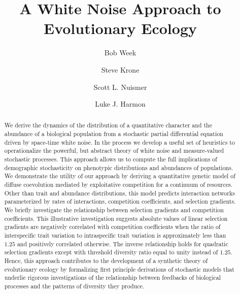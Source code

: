\documentclass[]{elsarticle} %
\begin{document}
\begin{frontmatter}

  \title{A White Noise Approach to Evolutionary Ecology}
    \author[Bio]{Bob Week}
    \author[Stats]{Steve Krone}
  
    \author[Bio]{Scott L. Nuismer}
  
    \author[Bio]{Luke J. Harmon}
  
      \address[Bio]{University of Idaho, Department of Biological Sciences, 875 Perimeter
Drive MS 3051, Moscow, Idaho, 83844}
    \address[Stats]{University of Idaho, Department of Statistical Science, 875 Perimeter
Drive MS 1104, Moscow, Idaho, 83844}
  
  \begin{abstract}
  We derive the dynamics of the distribution of a quantitative character
  and the abundance of a biological population from a stochastic partial
  differential equation driven by space-time white noise. In the process
  we develop a useful set of heuristics to operationalize the powerful,
  but abstract theory of white noise and measure-valued stochastic
  processes. This approach allows us to compute the full implications of
  demographic stochasticity on phenotypic distributions and abundances of
  populations. We demonstrate the utility of our approach by deriving a
  quantitative genetic model of diffuse coevolution mediated by
  exploitative competition for a continuum of resources. Other than trait
  and abundance distributions, this model predicts interaction networks
  parameterized by rates of interactions, competition coefficients, and
  selection gradients. We briefly investigate the relationship between
  selection gradients and competition coefficients. This illustrative
  investigation suggests absolute values of linear selection gradients are
  negatively correlated with competition coefficients when the ratio of
  interspecific trait variation to intraspecific trait variation is
  approximately less than \(1.25\) and positively correlated otherwise.
  The inverse relationship holds for quadratic selection gradients except
  with threshold diversity ratio equal to unity instead of \(1.25\).
  Hence, this approach contributes to the development of a synthetic
  theory of evolutionary ecology by formalizing first principle
  derivations of stochastic models that underlie rigorous investigations
  of the relationship between feedbacks of biological processes and the
  patterns of diversity they produce.
  \end{abstract}
  
 \end{frontmatter}
\end{document}
